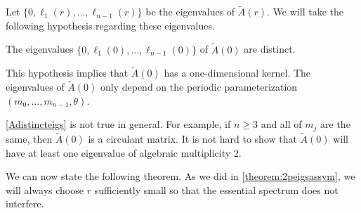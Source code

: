 \documentclass[thesis.tex]{subfiles}
\begin{document}
Let $\{ 0, \ell_1(r), \dots, \ell_{n-1}(r) \}$ be the eigenvalues of $\tilde{A}(r)$. We will take the following hypothesis regarding these eigenvalues.

\begin{hypothesis}\label{Adistincteigs}
The eigenvalues $\{ 0, \ell_1(0), \dots, \ell_{n-1}(0)\}$ of $\tilde{A}(0)$ are distinct.
\end{hypothesis}
This hypothesis implies that $\tilde{A}(0)$ has a one-dimensional kernel. The eigenvalues of $\tilde{A}(0)$ only depend on the periodic parameterization $(m_0, \dots, m_{n-1}, \theta)$.

\begin{remark}
\cref{Adistincteigs} is not true in general. For example, if $n \geq 3$ and all of $m_j$ are the same, then $\tilde{A}(0)$ is a circulant matrix. It is not hard to show that $\tilde{A}(0)$ will have at least one eigenvalue of algebraic multiplicity 2.
\end{remark}

We can now state the following theorem. As we did in \cref{theorem:2peigsassym}, we will always choose $r$ sufficiently small so that the essential spectrum does not interfere.
\end{document}
